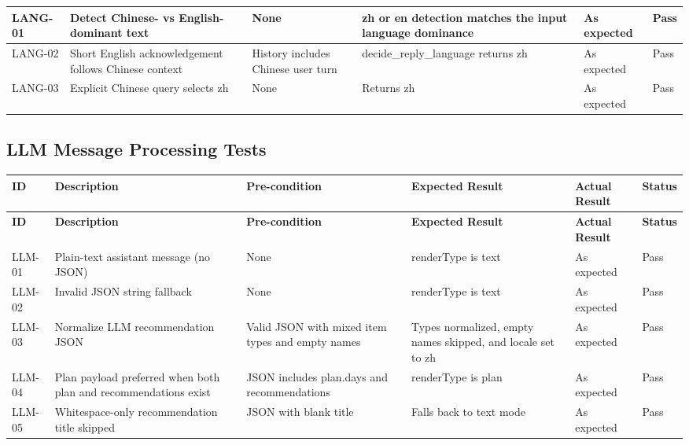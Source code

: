 \begin{appendices}
{\begin{longtable}{|p{1.2cm}|p{3.0cm}|p{2.8cm}|p{3.2cm}|p{2.2cm}|p{1.1cm}|}
LANG-01 &
Detect Chinese- vs English-dominant text &
None &
zh or en detection matches the input language dominance &
As expected &
Pass \\
\hline

LANG-02 &
Short English acknowledgement follows Chinese context &
History includes Chinese user turn &
decide\_reply\_language returns zh &
As expected &
Pass \\
\hline

LANG-03 &
Explicit Chinese query selects zh &
None &
Returns zh &
As expected &
Pass \\
\hline

\end{longtable}

\subsection*{LLM Message Processing Tests}
\begin{longtable}{|p{1.2cm}|p{3.0cm}|p{2.8cm}|p{3.2cm}|p{2.2cm}|p{1.1cm}|}
\hline
\textbf{ID} & \textbf{Description} & \textbf{Pre-condition} & \textbf{Expected Result} & \textbf{Actual Result} & \textbf{Status} \\
\hline
\endfirsthead
\hline
\textbf{ID} & \textbf{Description} & \textbf{Pre-condition} & \textbf{Expected Result} & \textbf{Actual Result} & \textbf{Status} \\
\hline
\endhead
\hline
\endfoot

LLM-01 &
Plain-text assistant message (no JSON) &
None &
renderType is text &
As expected &
Pass \\
\hline

LLM-02 &
Invalid JSON string fallback &
None &
renderType is text &
As expected &
Pass \\
\hline

LLM-03 &
Normalize LLM recommendation JSON &
Valid JSON with mixed item types and empty names &
Types normalized, empty names skipped, and locale set to zh &
As expected &
Pass \\
\hline

LLM-04 &
Plan payload preferred when both plan and recommendations exist &
JSON includes plan.days and recommendations &
renderType is plan &
As expected &
Pass \\
\hline

LLM-05 &
Whitespace-only recommendation title skipped &
JSON with blank title &
Falls back to text mode &
As expected &
Pass \\
\hline


\end{longtable}}
\end{appendices}

